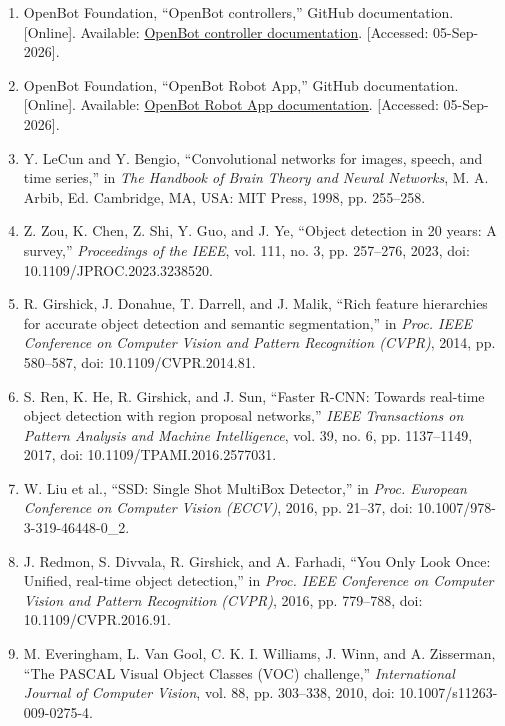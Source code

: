 \begin{enumerate}
    \item \label{ref:openbot_controller} OpenBot Foundation, ``OpenBot controllers,'' GitHub documentation. [Online]. Available: \href{https://github.com/ob-f/OpenBot/tree/master/controller}{OpenBot controller documentation}. [Accessed: 05-Sep-2026].
    \item \label{ref:openbot_robot_app} OpenBot Foundation, ``OpenBot Robot App,'' GitHub documentation. [Online]. Available: \href{https://github.com/ob-f/OpenBot/tree/master/android/robot}{OpenBot Robot App documentation}. [Accessed: 05-Sep-2026].
    \item \label{ref:cnn} Y. LeCun and Y. Bengio, ``Convolutional networks for images, speech, and time series,'' in \textit{The Handbook of Brain Theory and Neural Networks}, M. A. Arbib, Ed. Cambridge, MA, USA: MIT Press, 1998, pp. 255--258.
    \item \label{ref:odsurvey} Z. Zou, K. Chen, Z. Shi, Y. Guo, and J. Ye, ``Object detection in 20 years: A survey,'' \textit{Proceedings of the IEEE}, vol. 111, no. 3, pp. 257--276, 2023, doi: 10.1109/JPROC.2023.3238520.
    \item \label{ref:rcnn} R. Girshick, J. Donahue, T. Darrell, and J. Malik, ``Rich feature hierarchies for accurate object detection and semantic segmentation,'' in \textit{Proc. IEEE Conference on Computer Vision and Pattern Recognition (CVPR)}, 2014, pp. 580--587, doi: 10.1109/CVPR.2014.81.
    \item \label{ref:faster_rcnn} S. Ren, K. He, R. Girshick, and J. Sun, ``Faster R-CNN: Towards real-time object detection with region proposal networks,'' \textit{IEEE Transactions on Pattern Analysis and Machine Intelligence}, vol. 39, no. 6, pp. 1137--1149, 2017, doi: 10.1109/TPAMI.2016.2577031.
    \item \label{ref:ssd} W. Liu et al., ``SSD: Single Shot MultiBox Detector,'' in \textit{Proc. European Conference on Computer Vision (ECCV)}, 2016, pp. 21--37, doi: 10.1007/978-3-319-46448-0\_2.
    \item \label{ref:yolo} J. Redmon, S. Divvala, R. Girshick, and A. Farhadi, ``You Only Look Once: Unified, real-time object detection,'' in \textit{Proc. IEEE Conference on Computer Vision and Pattern Recognition (CVPR)}, 2016, pp. 779--788, doi: 10.1109/CVPR.2016.91.
    \item \label{ref:pascal_voc} M. Everingham, L. Van Gool, C. K. I. Williams, J. Winn, and A. Zisserman, ``The PASCAL Visual Object Classes (VOC) challenge,'' \textit{International Journal of Computer Vision}, vol. 88, pp. 303--338, 2010, doi: 10.1007/s11263-009-0275-4.

\end{enumerate}
